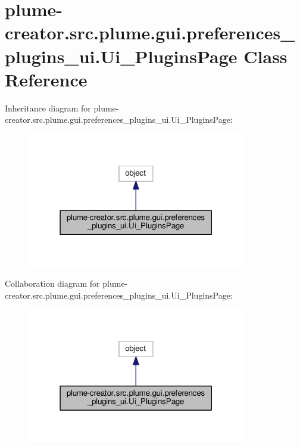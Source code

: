 \hypertarget{classplume-creator_1_1src_1_1plume_1_1gui_1_1preferences__plugins__ui_1_1_ui___plugins_page}{}\section{plume-\/creator.src.\+plume.\+gui.\+preferences\+\_\+plugins\+\_\+ui.\+Ui\+\_\+\+Plugins\+Page Class Reference}
\label{classplume-creator_1_1src_1_1plume_1_1gui_1_1preferences__plugins__ui_1_1_ui___plugins_page}


Inheritance diagram for plume-\/creator.src.\+plume.\+gui.\+preferences\+\_\+plugins\+\_\+ui.\+Ui\+\_\+\+Plugins\+Page\+:\nopagebreak
\begin{figure}[H]
\begin{center}
\leavevmode
\includegraphics[width=271pt]{classplume-creator_1_1src_1_1plume_1_1gui_1_1preferences__plugins__ui_1_1_ui___plugins_page__inherit__graph}
\end{center}
\end{figure}


Collaboration diagram for plume-\/creator.src.\+plume.\+gui.\+preferences\+\_\+plugins\+\_\+ui.\+Ui\+\_\+\+Plugins\+Page\+:\nopagebreak
\begin{figure}[H]
\begin{center}
\leavevmode
\includegraphics[width=271pt]{classplume-creator_1_1src_1_1plume_1_1gui_1_1preferences__plugins__ui_1_1_ui___plugins_page__coll__graph}
\end{center}
\end{figure}
